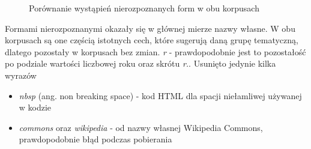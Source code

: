 \begin{figure}[ht!]
	\centering
    \qquad
	\caption{Porównanie wystąpień nierozpoznanych form w obu korpusach}
    \label{fig:freq-ign-words}
\end{figure}

Formami nierozpoznanymi okazały się w głównej mierze nazwy własne. W obu korpusach są one częścią istotnych cech, które sugerują daną grupę tematyczną, dlatego pozostały w korpusach bez zmian. \textit{r} - prawdopodobnie jest to pozostałość po podziale wartości liczbowej roku oraz skrótu \textit{r.}.
Usunięto jedynie kilka wyrazów
\begin{itemize}
\item \textit{nbsp} (ang. non breaking space) - kod HTML dla spacji niełamliwej używanej w kodzie \cite{nbsp-wikipedia}
\item \textit{commons} oraz \textit{wikipedia} - od nazwy własnej Wikipedia Commons, prawdopodobnie błąd podczas pobierania
\end{itemize}

